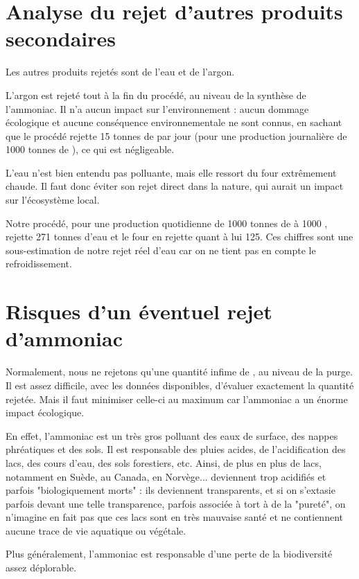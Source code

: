\documentclass[a4paper, oneside]{scrartcl}
\begin{document}
\section{Analyse du rejet d'autres produits secondaires}
Les autres produits rejetés sont de l'eau et de l'argon.
 

L'argon est rejeté tout à la fin du procédé, au niveau de la synthèse de l'ammoniac. Il n'a aucun impact sur l'environnement : aucun dommage écologique et aucune conséquence environnementale ne sont connus, en sachant que le procédé rejette 15 tonnes de  par jour (pour une production journalière de 1000 tonnes de ), ce qui est négligeable.
 

L'eau n'est bien entendu pas polluante, mais elle ressort du four extrêmement chaude. Il faut donc éviter son rejet direct dans la nature, qui aurait un impact sur l'écosystème local.

Notre procédé, pour une production quotidienne de 1000 tonnes de  à 1000 \kelvin, rejette 271 tonnes d'eau et le four en rejette quant à lui 125. Ces chiffres sont une sous-estimation de notre rejet réel d'eau car on ne tient pas en compte le refroidissement.

\section{Risques d'un éventuel rejet d'ammoniac \cite{ammo1} \cite{ammo2} \cite{ammo3}}
Normalement, nous ne rejetons qu'une quantité infime de , au niveau de la purge. Il est assez difficile, avec les données disponibles, d'évaluer exactement la quantité rejetée. Mais il faut minimiser celle-ci au maximum car l'ammoniac a un énorme impact écologique.
 

En effet, l'ammoniac est un très gros polluant des eaux de surface, des nappes phréatiques et des sols. Il est responsable des pluies acides, de l'acidification des lacs, des cours d'eau, des sols forestiers, etc. Ainsi, de plus en plus de lacs, notamment en Suède, au Canada, en Norvège... deviennent trop acidifiés et parfois "biologiquement morts" : ils deviennent transparents, et si on s'extasie parfois devant une telle transparence, parfois associée à tort à de la "pureté", on n'imagine en fait pas que ces lacs sont en très mauvaise santé et ne contiennent aucune trace de vie aquatique ou végétale.
 

Plus généralement, l'ammoniac est responsable d'une perte de la biodiversité assez déplorable.
\end{document}
